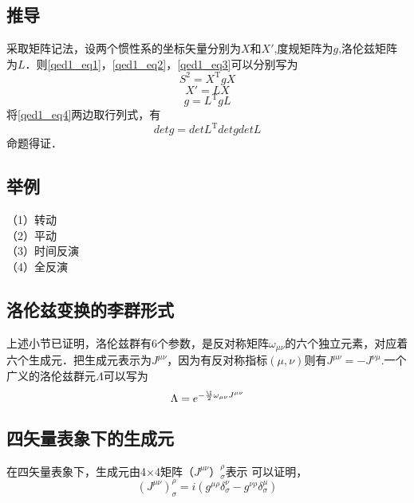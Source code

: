 \subsection{推导}
采取矩阵记法，设两个惯性系的坐标矢量分别为$X$和$X'$,度规矩阵为$g$,洛伦兹矩阵为$L$．则\autoref{qed1_eq1}，\autoref{qed1_eq2}，\autoref{qed1_eq3}可以分别写为
\begin{equation}
S^{2}=X^{\mathrm{T}} g X
\end{equation}
\begin{equation}
X'=LX
\end{equation}
\begin{equation}\label{qed1_eq4}
g=L^{\mathrm{T}} g L
\end{equation}
将\autoref{qed1_eq4}两边取行列式，有
\begin{equation}
detg=detL^{\mathrm{T}} detg detL
\end{equation}
命题得证．
\subsection{举例}
（1）转动\\
（2）平动\\
（3）时间反演\\
（4）全反演\\
\subsection{洛伦兹变换的李群形式}
上述小节已证明，洛伦兹群有6个参数，是反对称矩阵$\omega_{\mu\nu}$的六个独立元素，对应着六个生成元．把生成元表示为$J^{\mu\nu}$，因为有反对称指标$(\mu,\nu)$则有$J^{\mu\nu}=-J^{\nu\mu}$.一个广义的洛伦兹群元$\Lambda$可以写为
\begin{equation}
\Lambda=e^{-\frac{\I}{2} \omega_{\mu\nu}J^{\mu\nu}}
\end{equation}
\subsection{四矢量表象下的生成元}
在四矢量表象下，生成元由4×4矩阵$（J^{\mu\nu}）_\sigma^\rho$表示
可以证明，
\begin{equation}\left(J^{\mu \nu}\right)_{\sigma}^{\rho}=i\left(g^{\mu \rho} \delta_{\sigma}^{\nu}-g^{\nu \rho} \delta_{\sigma}^{\mu}\right)\end{equation}
